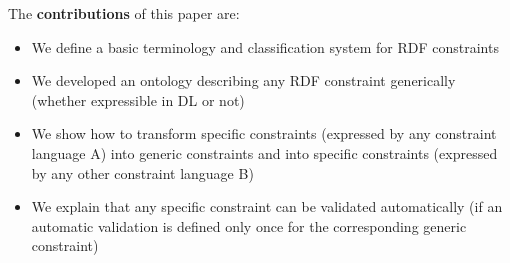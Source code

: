 \documentclass{llncs}
\begin{document}
The \textbf{contributions} of this paper are:
\begin{itemize}
	\item We define a basic terminology and classification system for RDF constraints
	\item We developed an ontology describing any RDF constraint generically (whether expressible in DL or not)%
	\item We show how to transform specific constraints (expressed by any constraint language A) into generic constraints and into specific constraints (expressed by any other constraint language B)
  \item We explain that any specific constraint can be validated automatically (if an automatic validation is defined only once for the corresponding generic constraint)
\end{itemize}

\end{document}
